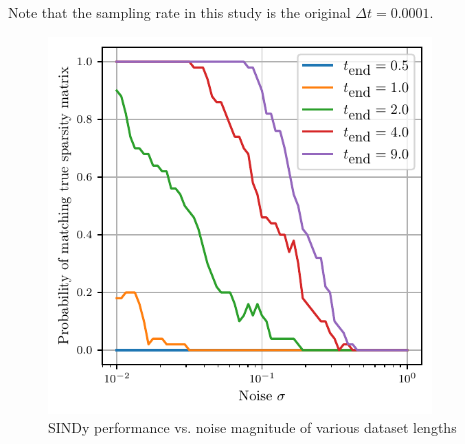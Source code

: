 \documentclass[11pt]{article}
\begin{document}
Note that the sampling rate in this study is the original $\Delta t = 0.0001$.


\begin{figure}[H]
    \centering
    \includegraphics[width=4in]{p2fig2.pdf}
    \caption{SINDy performance vs. noise magnitude of various dataset lengths}
    \label{p2cfig1}
\end{figure}
\end{document}

